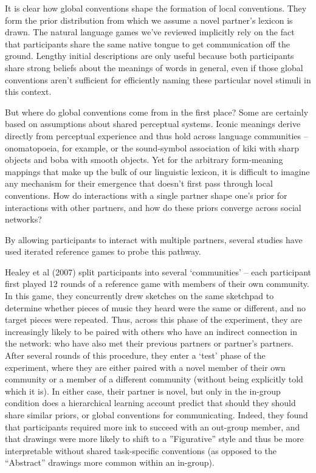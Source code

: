 \documentclass[11pt, floatsintext, jou]{apa6}
\begin{document}
It is clear how global conventions shape the formation of local conventions. They form the prior distribution from which we assume a novel partner's lexicon is drawn. The natural language games we've reviewed %
implicitly rely on the fact that participants share the same native tongue to get communication off the ground. Lengthy initial descriptions are only useful because both participants share strong beliefs about the meanings of words in general, even if those global conventions aren't sufficient for efficiently naming these particular novel stimuli in this context. 

But where do global conventions come from in the first place? Some are certainly based on assumptions about shared perceptual systems. Iconic meanings derive directly from perceptual experience and thus hold across language communities -- onomatopoeia, for example, or the sound-symbol association of kiki with sharp objects and boba with smooth objects. Yet for the arbitrary form-meaning mappings that make up the bulk of our linguistic lexicon, it is difficult to imagine any mechanism for their emergence that doesn't first pass through local conventions. How do interactions with a single partner shape one's prior for interactions with other partners, and how do these priors converge across social networks? 

By allowing participants to interact with multiple partners, several studies have used iterated reference games to probe this pathway. 

Healey et al (2007) split participants into several `communities' -- each participant first played 12 rounds of a reference game with members of their own community. In this game, they concurrently drew sketches on the same sketchpad to determine whether pieces of music they heard were the same or different, and no target pieces were repeated. Thus, across this phase of the experiment, they are increasingly likely to be paired with others who have an indirect connection in the network: who have also met their previous partners or partner's partners. After several rounds of this procedure, they enter a `test' phase of the experiment, where they are either paired with a novel member of their own community or a member of a different community (without being explicitly told which it is). In either case, their partner is novel, but only in the in-group condition does a hierarchical learning account predict that should they should share similar priors, or global conventions for communicating. Indeed, they found that participants required more ink to succeed with an out-group member, and that drawings were more likely to shift to a ''Figurative'' style and thus be more interpretable without shared task-specific conventions (as opposed to the ``Abstract'' drawings more common within an in-group). 
\end{document}
